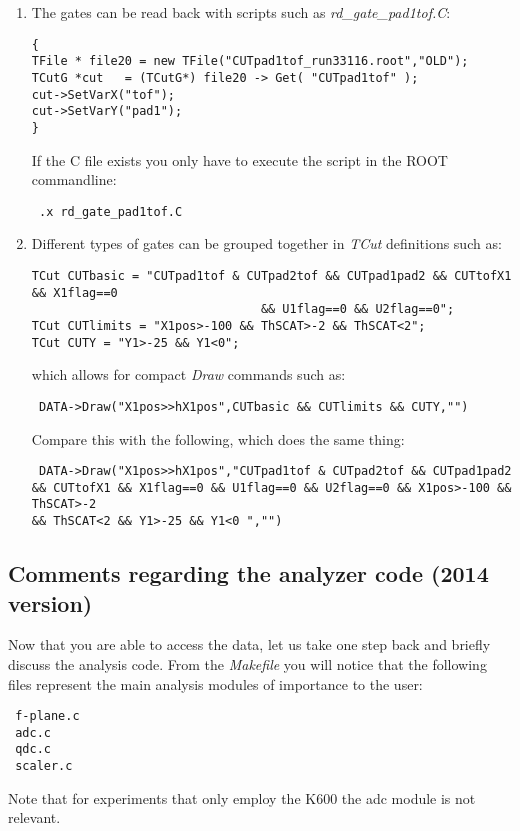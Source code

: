\documentclass[11pt]{report}
\begin{document}
\begin{enumerate}
\item The gates can be read back with scripts such as {\it rd\_gate\_pad1tof.C}:
\begin{verbatim}
{
TFile * file20 = new TFile("CUTpad1tof_run33116.root","OLD");
TCutG *cut   = (TCutG*) file20 -> Get( "CUTpad1tof" );
cut->SetVarX("tof");
cut->SetVarY("pad1");
}
\end{verbatim}
If the C file exists you only have to execute the script in the ROOT commandline:
\begin{verbatim} .x rd_gate_pad1tof.C  \end{verbatim}

\item Different types of gates can be grouped together in {\it TCut} definitions such as:
\begin{verbatim}
TCut CUTbasic = "CUTpad1tof & CUTpad2tof && CUTpad1pad2 && CUTtofX1 && X1flag==0 
								&& U1flag==0 && U2flag==0";
TCut CUTlimits = "X1pos>-100 && ThSCAT>-2 && ThSCAT<2";
TCut CUTY = "Y1>-25 && Y1<0";  
\end{verbatim}
which allows for compact {\it Draw} commands such as:
\begin{verbatim} DATA->Draw("X1pos>>hX1pos",CUTbasic && CUTlimits && CUTY,"")  \end{verbatim}
Compare this with the following, which does the same thing:
\begin{verbatim} DATA->Draw("X1pos>>hX1pos","CUTpad1tof & CUTpad2tof && CUTpad1pad2 
&& CUTtofX1 && X1flag==0 && U1flag==0 && U2flag==0 && X1pos>-100 && ThSCAT>-2 
&& ThSCAT<2 && Y1>-25 && Y1<0 ","")  \end{verbatim}

\end{enumerate}



\subsection{Comments regarding the analyzer code (2014 version)}

Now that you are able to access the data, let us take one step back and 
briefly discuss the analysis code.
From the {\it Makefile} you will notice that the following files represent the main
analysis modules of importance to the user:
\begin{verbatim} f-plane.c 
 adc.c 
 qdc.c 
 scaler.c   \end{verbatim}
Note that for experiments that only employ the K600 the adc module is not relevant.
\end{document}

